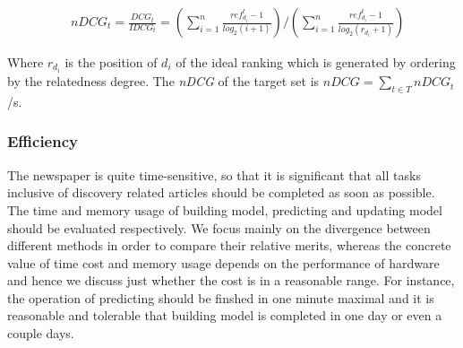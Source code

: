 \begin{align}
   & nDCG_t = \frac{DCG_t}{IDCG_t} = (\sum_{i=1}^n\frac{ref_{d_i}^t-1}{log_2(i+1)})/(\sum_{i=1}^n\frac{ref_{d_i}^t-1}{log_2(r_{d_i}+1)})
\end{align}

Where $r_{d_i}$ is the position of $d_i$ of the ideal ranking which is generated by ordering by the relatedness degree. The \textit{nDCG} of the target set is $nDCG = \sum_{t \in T}nDCG_t$/s.

\subsubsection{Efficiency}

The newspaper is quite time-sensitive, so that it is significant that all tasks inclusive of discovery related articles should be completed as soon as possible. The time and memory usage of building model, predicting and updating model should be evaluated respectively. We focus mainly on the divergence between different methods in order to compare their relative merits, whereas the concrete value of time cost and memory usage depends on the performance of hardware and hence we discuss just whether the cost is in a reasonable range. For instance, the operation of predicting should be finshed in one minute maximal and it is reasonable and tolerable that building model is completed in one day or even a couple days. 